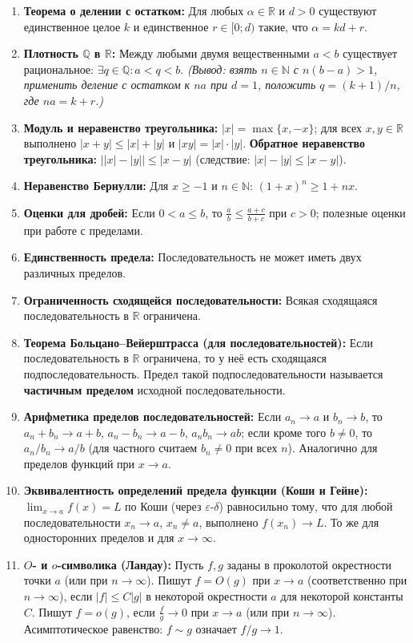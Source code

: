 \documentclass[11pt, a4paper]{extarticle}
\newcommand{\de}{\delta}
\newcommand{\ep}{\varepsilon}
\newcommand{\R}{{\mathbb R}}
\newcommand{\Q}{{\mathbb Q}}
\newcommand{\N}{{\mathbb N}}
\renewcommand{\le}{\leqslant}
\renewcommand{\ge}{\geqslant}
\begin{document}
\begin{enumerate}
    \item \textbf{Теорема о делении с остатком:} Для любых $\alpha \in \R$ и $d > 0$ существуют единственное целое $k$ и единственное $r \in [0; d)$ такие, что $\alpha = kd + r$.
    \item \textbf{Плотность $\Q$ в $\R$:} Между любыми двумя вещественными $a < b$ существует рациональное: $\exists q \in \Q: a < q < b$. \textit{(Вывод: взять $n \in \N$ с $n(b-a)>1$, применить деление с остатком к $na$ при $d=1$, положить $q=(k+1)/n$, где $na = k + r$.)}
    \item \textbf{Модуль и неравенство треугольника:} $|x| = \max\{x, -x\}$; для всех $x, y \in \R$ выполнено $|x + y| \le |x| + |y|$ и $|xy| = |x| \cdot |y|$. \textbf{Обратное неравенство треугольника:} $\bigl| |x| - |y| \bigr| \le |x - y|$ (следствие: $|x| - |y| \le |x - y|$).
    \item \textbf{Неравенство Бернулли:} Для $x \ge -1$ и $n \in \N$: $(1+x)^n \ge 1 + nx$.
    \item \textbf{Оценки для дробей:} Если $0 < a \le b$, то $\frac{a}{b} \le \frac{a+c}{b+c}$ при $c > 0$; полезные оценки при работе с пределами.
    \item \textbf{Единственность предела:} Последовательность не может иметь двух различных пределов.
    \item \textbf{Ограниченность сходящейся последовательности:} Всякая сходящаяся последовательность в $\R$ ограничена.
    \item \textbf{Теорема Больцано--Вейерштрасса (для последовательностей):} Если последовательность в $\R$ ограничена, то у неё есть сходящаяся подпоследовательность. Предел такой подпоследовательности называется \textbf{частичным пределом} исходной последовательности.
    \item \textbf{Арифметика пределов последовательностей:} Если $a_n \to a$ и $b_n \to b$, то $a_n + b_n \to a + b$, $a_n - b_n \to a - b$, $a_n b_n \to ab$; если кроме того $b \neq 0$, то $a_n/b_n \to a/b$ (для частного считаем $b_n \neq 0$ при всех $n$). Аналогично для пределов функций при $x \to a$.
    \item \textbf{Эквивалентность определений предела функции (Коши и Гейне):} $\lim_{x \to a} f(x) = L$ по Коши (через $\ep$-$\de$) равносильно тому, что для любой последовательности $x_n \to a$, $x_n \neq a$, выполнено $f(x_n) \to L$. То же для односторонних пределов и для $x \to \infty$.
    \item \textbf{$O$- и $o$-символика (Ландау):} Пусть $f,g$ заданы в проколотой окрестности точки $a$ (или при $n \to \infty$). Пишут $f = O(g)$ при $x \to a$ (соответственно при $n \to \infty$), если $|f| \le C|g|$ в некоторой окрестности $a$ для некоторой константы $C$. Пишут $f = o(g)$, если $\frac{f}{g} \to 0$ при $x \to a$ (или при $n \to \infty$). Асимптотическое равенство: $f \sim g$ означает $f/g \to 1$.
\end{enumerate}
\end{document}
